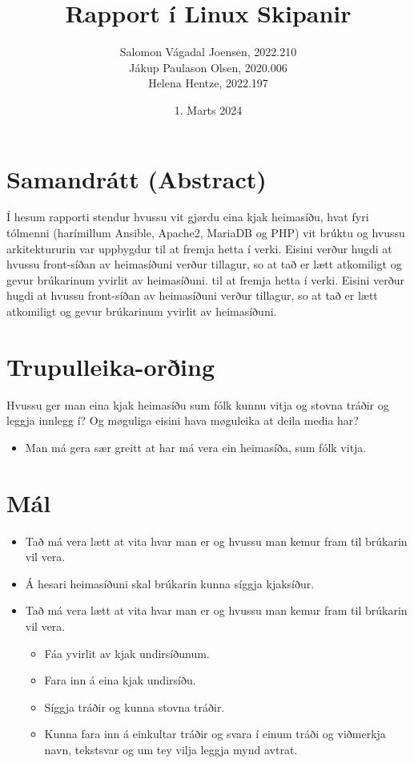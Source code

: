 \documentclass{article}
\title{Rapport í Linux Skipanir}
\author{Salomon Vágadal Joensen, 2022.210\\Jákup Paulason Olsen, 2020.006\\Helena Hentze, 2022.197}
\date{1. Marts 2024}
\begin{document}


\tableofcontents
\newpage

\section{Samandrátt (Abstract)}
\par Í hesum rapporti stendur hvussu vit gjørdu eina kjak heimasíðu, hvat fyri tólmenni
(harímillum Ansible, Apache2, MariaDB og PHP) vit brúktu og hvussu arkitektururin var uppbygdur
til at fremja hetta í verki. Eisini verður hugdi at hvussu front-síðan av heimasíðuni verður tillagur, 
so at tað er lætt atkomiligt og gevur brúkarinum yvirlit av heimasíðuni.
til at fremja hetta í verki. Eisini verður hugdi at hvussu front-síðan av heimasíðuni verður tillagur, 
so at tað er lætt atkomiligt og gevur brúkarinum yvirlit av heimasíðuni.

\section{Trupulleika-orðing}
\par Hvussu ger man eina kjak heimasíðu sum fólk kunnu vitja og stovna tráðir og leggja innlegg í? 
Og møguliga eisini hava møguleika at deila media har? 
\begin{itemize}
    \item Man má gera sær greitt at har má vera ein heimasíða, sum fólk vitja.
\end{itemize}

\section{Mál}

\begin{itemize}
    \item Tað má vera lætt at vita hvar man er og hvussu man kemur fram til brúkarin vil vera.
    \item Á hesari heimasíðuni skal brúkarin kunna síggja kjaksíður.
    \item Tað má vera lætt at vita hvar man er og hvussu man kemur fram til brúkarin vil vera.
    \begin{itemize}
        \item Fáa yvirlit av kjak undirsíðunum.
        \item Fara inn á eina kjak undirsíðu.
        \item Síggja tráðir og kunna stovna tráðir.
        \item Kunna fara inn á einkultar tráðir og svara í einum tráði og viðmerkja navn, tekstsvar og um tey vilja leggja mynd avtrat. 
    \end{itemize}
\end{itemize} 
\end{document}

